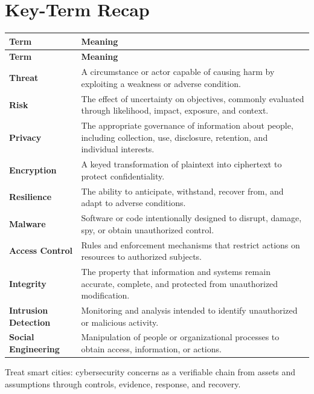 \documentclass[11pt]{article}
\begin{document}
\section*{Key-Term Recap}
\begin{longtable}{>{\RaggedRight\arraybackslash}p{}>{\RaggedRight\arraybackslash}p{}}
\toprule\rowcolor{Navy}\color{white}\textbf{Term} & \color{white}\textbf{Meaning}\\\midrule
\endfirsthead
\toprule\rowcolor{Navy}\color{white}\textbf{Term} & \color{white}\textbf{Meaning}\\\midrule
\endhead
\textbf{Threat} & A circumstance or actor capable of causing harm by exploiting a weakness or adverse condition. \\\midrule
\textbf{Risk} & The effect of uncertainty on objectives, commonly evaluated through likelihood, impact, exposure, and context. \\\midrule
\textbf{Privacy} & The appropriate governance of information about people, including collection, use, disclosure, retention, and individual interests. \\\midrule
\textbf{Encryption} & A keyed transformation of plaintext into ciphertext to protect confidentiality. \\\midrule
\textbf{Resilience} & The ability to anticipate, withstand, recover from, and adapt to adverse conditions. \\\midrule
\textbf{Malware} & Software or code intentionally designed to disrupt, damage, spy, or obtain unauthorized control. \\\midrule
\textbf{Access Control} & Rules and enforcement mechanisms that restrict actions on resources to authorized subjects. \\\midrule
\textbf{Integrity} & The property that information and systems remain accurate, complete, and protected from unauthorized modification. \\\midrule
\textbf{Intrusion Detection} & Monitoring and analysis intended to identify unauthorized or malicious activity. \\\midrule
\textbf{Social Engineering} & Manipulation of people or organizational processes to obtain access, information, or actions. \\\midrule
\bottomrule
\end{longtable}
\begin{takeawaybox}
Treat smart cities: cybersecurity concerns as a verifiable chain from assets and assumptions through controls, evidence, response, and recovery.
\end{takeawaybox}
\end{document}
